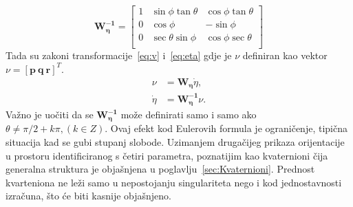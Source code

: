 \documentclass[times, utf8, diplomski]{fer}
\begin{document}
{\begin{equation}
	\mathbf{W^{-1}_\eta} =
	\begin{bmatrix}
	1 & \sin\phi\tan\theta & \cos\phi\tan\theta \\
	0 & \cos\phi & -\sin\phi \\
	0 & \sec\theta\sin\phi & \cos\phi\sec\theta \\
	\end{bmatrix}
	\label{eq:matBrzina}
\end{equation}
Tada su zakoni transformacije~\ref{eq:v} i~\ref{eq:eta} gdje je $\nu$ definiran kao vektor $\nu=[\mathbf{p ~q ~r}]^T$.
\begin{align}
\nu&=\mathbf{W_\eta}\dot{\eta},\label{eq:v}\\
\dot{\eta}&=\mathbf{W^{-1}_\eta}\nu.\label{eq:eta}
\end{align}
Važno je uočiti da se $\mathbf{W^{-1}_\eta}$ može definirati samo i samo ako $\theta \neq \pi/2+k\pi, (k \in Z)$. Ovaj efekt kod Eulerovih formula je ograničenje, tipična situacija kad se gubi stupanj slobode. Uzimanjem drugačijeg prikaza orijentacije u prostoru identificiranog s četiri parametra, poznatijim kao kvaternioni čija generalna struktura je objašnjena u poglavlju~\ref{sec:Kvaternioni}. Prednost kvarteniona ne leži samo u nepostojanju singulariteta nego i kod jednostavnosti izračuna, što će biti kasnije objašnjeno.

}
\end{document}

